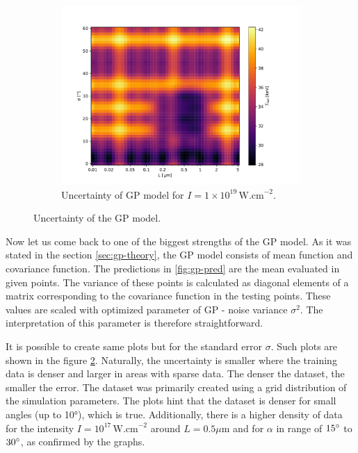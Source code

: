 \begin{figure}[ht]
\begin{subfigure}{0.49\textwidth}
		\centering
		\includegraphics[width=\textwidth]{figures/gp19_pred_ss}
		\caption{Uncertainty of GP model for $I = 1 \times 10^{19} \, \mathrm{W.cm}^{-2}$.}
		\label{fig:gp-pred-ss-c}
	\end{subfigure}
	\caption{Uncertainty of the GP model.}
	\label{fig:gp-pred-ss}
\end{figure}

Now let us come back to one of the biggest strengths of the GP model. As it was stated in the section \ref{sec:gp-theory}, the GP model consists of mean function and covariance function. The predictions in \ref{fig:gp-pred} are the mean evaluated in given points. The variance of these points is calculated as diagonal elements of a matrix corresponding to the covariance function in the testing points. These values are scaled with optimized parameter of GP - noise variance $\sigma^2$. The interpretation of this parameter is therefore straightforward.

It is possible to create same plots but for the standard error $\sigma$. Such plots are shown in the figure \ref{fig:gp-pred-ss}. Naturally, the uncertainty is smaller where the training data is denser and larger in areas with sparse data. The denser the dataset, the smaller the error. The dataset was primarily created using a grid distribution of the simulation parameters. The plots hint that the dataset is denser for small angles (up to 10°), which is true. Additionally, there is a higher density of data for the intensity $I = 10^{17} \, \mathrm{W.cm}^{-2}$ around $L = 0.5\mu \mathrm{m}$ and for $\alpha$ in range of $15\degree$ to $ 30\degree$, as confirmed by the graphs.

